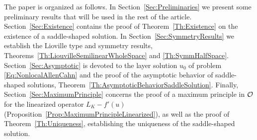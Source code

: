 The paper is organized as follows. In Section~\ref{Sec:Preliminaries} we present some preliminary results that will be used in the rest of the article. Section~\ref{Sec:Existence} contains the proof of Theorem~\ref{Th:Existence} on the existence of a saddle-shaped solution. In Section~\ref{Sec:SymmetryResults} we establish the Lioville type and symmetry results, Theorems~\ref{Th:LiouvilleSemilinearWholeSpace} and \ref{Th:SymmHalfSpace}. Section~\ref{Sec:Asymptotic} is devoted to the layer solution $u_0$ of problem \eqref{Eq:NonlocalAllenCahn} and the proof of the asymptotic behavior of saddle-shaped solutions, Theorem~\ref{Th:AsymptoticBehaviorSaddleSolution}. Finally, Section~\ref{Sec:MaximumPrinciple} concerns the proof of a maximum principle in $\mathcal{O}$ for the linearized operator $L_K - f'(u)$ (Proposition~\ref{Prop:MaximumPrincipleLinearized}), as well as the proof of Theorem~\ref{Th:Uniqueness}, establishing the uniqueness of the saddle-shaped solution.

